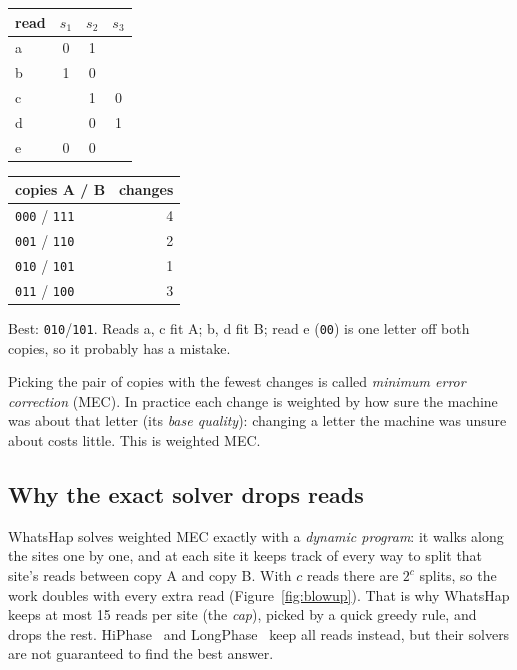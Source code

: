\documentclass[11pt]{article}
\newcommand{\dna}[1]{\texttt{#1}}
\begin{document}
\begin{center}
\small
\begin{tabular}{@{}lccc@{}}
\toprule
read & $s_1$ & $s_2$ & $s_3$\\
\midrule
a & 0 & 1 & \\
b & 1 & 0 & \\
c &   & 1 & 0\\
d &   & 0 & 1\\
e & 0 & 0 & \\
\bottomrule
\end{tabular}
\qquad
\begin{tabular}{@{}lr@{}}
\toprule
copies A / B & changes\\
\midrule
\dna{000} / \dna{111} & 4\\
\dna{001} / \dna{110} & 2\\
\dna{010} / \dna{101} & 1\\
\dna{011} / \dna{100} & 3\\
\bottomrule
\end{tabular}
\qquad
\begin{minipage}{6.2cm}\small
Best: \dna{010}/\dna{101}. Reads a, c fit A; b, d fit B; read e
(\dna{00}) is one letter off both copies, so it probably has a mistake.
\end{minipage}
\end{center}

Picking the pair of copies with the fewest changes is called \emph{minimum
error correction} (MEC). In practice each change is weighted by how sure the
machine was about that letter (its \emph{base quality}): changing a letter
the machine was unsure about costs little. This is weighted MEC.

\subsection{Why the exact solver drops reads}

WhatsHap solves weighted MEC exactly with a \emph{dynamic program}: it walks
along the sites one by one, and at each site it keeps track of every way to
split that site's reads between copy A and copy B. With $c$ reads there are
$2^c$ splits, so the work doubles with every extra read
(Figure~\ref{fig:blowup}). That is why WhatsHap keeps at most 15 reads per
site (the \emph{cap}), picked by a quick greedy rule, and drops the rest.
HiPhase~\cite{holt2024} and LongPhase~\cite{lin2022} keep all reads instead,
but their solvers are not guaranteed to find the best answer.
\end{document}
